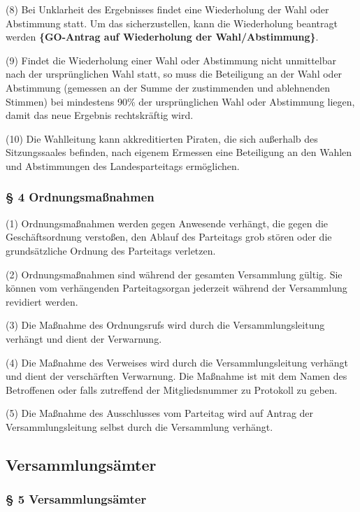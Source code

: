 (8) Bei Unklarheit des Ergebnisses findet eine Wiederholung der Wahl
oder Abstimmung statt. Um das sicherzustellen, kann die Wiederholung
beantragt werden \textbf{\{GO-Antrag auf Wiederholung der
Wahl/Abstimmung\}}.

(9) Findet die Wiederholung einer Wahl oder Abstimmung nicht unmittelbar
nach der ursprünglichen Wahl statt, so muss die Beteiligung an der Wahl
oder Abstimmung (gemessen an der Summe der zustimmenden und ablehnenden
Stimmen) bei mindestens 90\% der ursprünglichen Wahl oder Abstimmung
liegen, damit das neue Ergebnis rechtskräftig wird.

(10) Die Wahlleitung kann akkreditierten Piraten, die sich außerhalb des
Sitzungssaales befinden, nach eigenem Ermessen eine Beteiligung an den
Wahlen und Abstimmungen des Landesparteitags ermöglichen.

\subsubsection{§ 4 Ordnungsmaßnahmen}

(1) Ordnungsmaßnahmen werden gegen Anwesende verhängt, die gegen die
Geschäftsordnung verstoßen, den Ablauf des Parteitags grob stören oder
die grundsätzliche Ordnung des Parteitags verletzen.

(2) Ordnungsmaßnahmen sind während der gesamten Versammlung gültig. Sie
können vom verhängenden Parteitagsorgan jederzeit während der
Versammlung revidiert werden.

(3) Die Maßnahme des Ordnungsrufs wird durch die Versammlungsleitung
verhängt und dient der Verwarnung.

(4) Die Maßnahme des Verweises wird durch die Versammlungsleitung
verhängt und dient der verschärften Verwarnung. Die Maßnahme ist mit dem
Namen des Betroffenen oder falls zutreffend der Mitgliedsnummer zu
Protokoll zu geben.

(5) Die Maßnahme des Ausschlusses vom Parteitag wird auf Antrag der
Versammlungsleitung selbst durch die Versammlung verhängt.

\subsection{Versammlungsämter}

\subsubsection{§ 5 Versammlungsämter}

